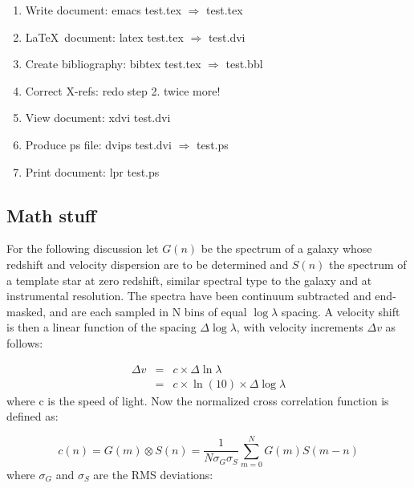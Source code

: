 \documentclass[11pt,a4paper]{emulateapj}
\begin{document}
\begin{enumerate}
  
\item Write document: emacs test.tex $\Longrightarrow$ test.tex
  
\item \LaTeX\ document: latex test.tex $\Longrightarrow$ test.dvi

\item Create bibliography: bibtex test.tex $\Longrightarrow$ test.bbl

\item Correct X-refs: redo step 2. twice more!
  
\item View document: xdvi test.dvi 

\item Produce ps file: dvips test.dvi $\Longrightarrow$ test.ps

\item Print document: lpr test.ps

\end{enumerate}

%
%
\subsection{Math stuff}

For the following discussion let $G(n)$ be the spectrum of a galaxy
whose redshift and velocity dispersion are to be determined and $S(n)$
the spectrum of a {template} star at zero redshift, similar spectral type
to the galaxy and at instrumental resolution. The spectra have been
continuum subtracted and end-masked, and are each sampled in N bins of
equal $\log \lambda$ spacing. A velocity shift is then a linear
function of the spacing $\Delta \log \lambda$, with velocity increments
$\Delta v$ as follows:

%
%
\begin{eqnarray}
  \Delta v &=& c \times \Delta \ln \lambda \\
           &=& c \times \ln (10) \times \Delta \log \lambda
\end{eqnarray}
where c is the speed of light. Now the normalized cross correlation
function is defined as:

\begin{equation}
  \label{equ:cross_corr}
  c(n)=G(m) \otimes S(n) = \frac{1}{N\sigma_G\sigma_S}\sum_{m=0}^{N}G(m)S(m-n)
\end{equation}
where $\sigma_G$ and $\sigma_S$ are the RMS deviations:
\end{document}
